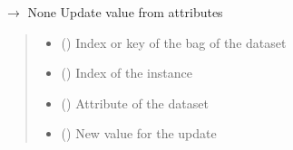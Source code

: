 \documentclass[letterpaper,10pt,english]{sphinxmanual}
\begin{document}
\begin{fulllineitems}
\begin{fulllineitems}
\label{\detokenize{data/_autosummary/miml.data.miml_dataset.MIMLDataset:miml.data.miml_dataset.MIMLDataset.set_attribute}}
\pysigstartsignatures
\pysiglinewithargsret
{}
{\sphinxparamcomma {}\sphinxparamcomma {}\sphinxparamcomma {}}
{{ $\rightarrow$ None}}
\pysigstopsignatures
\sphinxAtStartPar
Update value from attributes
\begin{quote}\begin{description}
\begin{itemize}
\item {} 
\sphinxAtStartPar
{} () \textendash{} Index or key of the bag of the dataset

\item {} 
\sphinxAtStartPar
{} () \textendash{} Index of the instance

\item {} 
\sphinxAtStartPar
{} () \textendash{} Attribute of the dataset

\item {} 
\sphinxAtStartPar
{} () \textendash{} New value for the update

\end{itemize}

\end{description}\end{quote}

\end{fulllineitems}



\end{fulllineitems}
\end{document}
